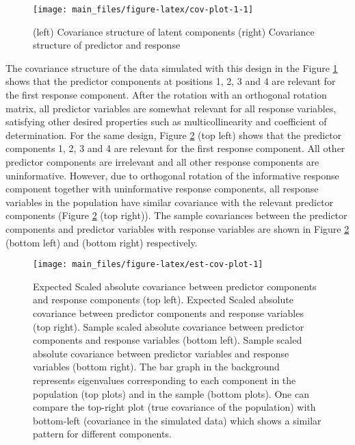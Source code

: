 \documentclass[review]{elsarticle}
\begin{document}
\begin{figure}
\texttt{[image: main\_files/figure-latex/cov-plot-1-1]} \caption{(left) Covariance structure of latent components (right) Covariance structure of predictor and response}\label{fig:cov-plot-1}
\end{figure}

The covariance structure of the data simulated with this design in the
Figure \ref{fig:cov-plot-1} shows that the predictor components at
positions 1, 2, 3 and 4 are relevant for the first response component.
After the rotation with an orthogonal rotation matrix, all predictor
variables are somewhat relevant for all response variables, satisfying
other desired properties such as multicollinearity and coefficient of
determination. For the same design, Figure \ref{fig:est-cov-plot} (top
left) shows that the predictor components 1, 2, 3 and 4 are relevant for
the first response component. All other predictor components are
irrelevant and all other response components are uninformative. However,
due to orthogonal rotation of the informative response component
together with uninformative response components, all response variables
in the population have similar covariance with the relevant predictor
components (Figure \ref{fig:est-cov-plot} (top right)). The sample
covariances between the predictor components and predictor variables
with response variables are shown in Figure \ref{fig:est-cov-plot}
(bottom left) and (bottom right) respectively.













\begin{figure}
\texttt{[image: main\_files/figure-latex/est-cov-plot-1]} \caption{Expected Scaled absolute covariance between predictor
components and response components (top left). Expected Scaled absolute
covariance between predictor components and response variables (top
right). Sample scaled absolute covariance between predictor components
and response variables (bottom left). Sample scaled absolute covariance
between predictor variables and response variables (bottom right). The
bar graph in the background represents eigenvalues corresponding to each
component in the population (top plots) and in the sample (bottom
plots). One can compare the top-right plot (true covariance of the
population) with bottom-left (covariance in the simulated data) which
shows a similar pattern for different components.}\label{fig:est-cov-plot}
\end{figure}
\end{document}
